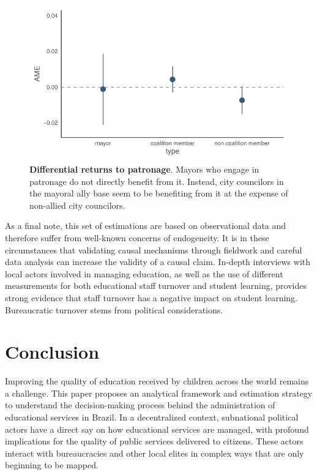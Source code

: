 \documentclass[12pt,a4paper]{article}
\begin{document}
\begin{figure}[h]
    \centering
    \includegraphics{plots/reelection_marginal_effect_plots.pdf}
    \caption{\textbf{Differential returns to patronage}. Mayors who engage in patronage do not directly benefit from it. Instead, city councilors in the mayoral ally base seem to be benefiting from it at the expense of non-allied city councilors.}
\end{figure}

As a final note, this set of estimations are based on observational data and therefore suffer from well-known concerns of endogeneity. It is in these circumstances that validating causal mechanisms through fieldwork and careful data analysis can increase the validity of a causal claim. In-depth interviews with local actors involved in managing education, as well as the use of different measurements for both educational staff turnover and student learning, provides strong evidence that staff turnover has a negative impact on student learning. Bureaucratic turnover stems from political considerations.



\section{Conclusion}
\label{sec:conclusion}

Improving the quality of education received by children across the world remains a challenge. This paper proposes an analytical framework and estimation strategy to understand the decision-making process behind the administration of educational services in Brazil. In a decentralized context, subnational political actors have a direct say on how educational services are managed, with profound implications for the quality of public services delivered to citizens. These actors interact with bureaucracies and other local elites in complex ways that are only beginning to be mapped.
\end{document}
